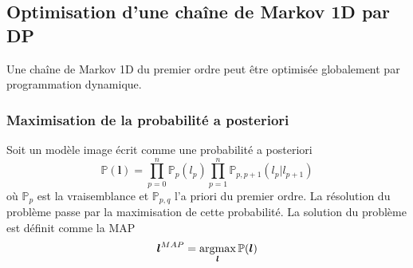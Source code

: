 \documentclass[../main/These_Mathias_Paget.tex]{subfiles}
\begin{document}
\subsection{Optimisation d'une chaîne de Markov 1D par DP}
\label{ss::DP_1D}

Une chaîne de Markov 1D du premier ordre peut être optimisée globalement par programmation dynamique.

\subsubsection{Maximisation de la probabilité a posteriori}

Soit un modèle image écrit comme une probabilité a posteriori
\begin{equation}
\mathbb{P}(\boldsymbol{l}) = \prod_{p=0}^{n}{\mathbb{P}_p(l_p)}\prod_{p=1}^{n}{\mathbb{P}_{p,p{+}1}(l_p|l_{p+1})}
\end{equation}
où $\mathbb{P}_p$ est la vraisemblance et  $\mathbb{P}_{p,q}$ l'a priori du premier ordre. La résolution du problème passe par la maximisation de cette probabilité. La solution du problème est définit comme la MAP 
\begin{equation}
\boldsymbol{l}^{MAP} = \argmax_{\boldsymbol{l}}{\mathbb{P}(\boldsymbol{l})}
\end{equation}
\end{document}
